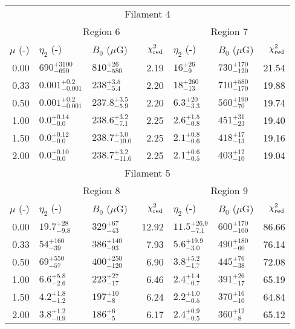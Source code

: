 \begin{tabular}{@{}rllr llr@{}}
\midrule
\multicolumn{7}{c}{Filament 4} \\
\cmidrule{1-7}
{} & \multicolumn{3}{c}{Region 6\tablenotemark{a,b}}
   & \multicolumn{3}{c}{Region 7} \\
\cmidrule(lr){2-4} \cmidrule(l){5-7}
$\mu$ (-) & $\eta_2$ (-) & $B_0$ ($\mu$G) & $\chi^2_{\mathrm{red}}$
          & $\eta_2$ (-) & $B_0$ ($\mu$G) & $\chi^2_{\mathrm{red}}$ \\
\cmidrule{1-7}

0.00 & ${690}^{+3100}_{-690}$ & ${810}^{+26}_{-580}$       & 2.19
     & ${16}^{+26}_{-9}$ & ${730}^{+170}_{-120}$           & 21.54 \\
0.33 & ${0.001}^{+0.2}_{-0.001}$ & ${238}^{+3.5}_{-5.4}$   & 2.20
     & ${18}^{+260}_{-13}$ & ${710}^{+580}_{-170}$         & 19.88 \\
0.50 & ${0.001}^{+0.2}_{-0.001}$ & ${237.8}^{+3.5}_{-5.9}$ & 2.20
     & ${6.3}^{+20}_{-3.3}$ & ${560}^{+190}_{-70}$         & 19.74 \\
1.00 & ${0.0}^{+0.14}_{-0.0}$ & ${238.6}^{+3.2}_{-7.1}$        & 2.25
     & ${2.6}^{+1.5}_{-0.8}$ & ${451}^{+31}_{-23}$         & 19.40 \\
1.50 & ${0.0}^{+0.12}_{-0.0}$ & ${238.7}^{+3.0}_{-10.0}$       & 2.25
     & ${2.1}^{+0.8}_{-0.6}$ & ${418}^{+17}_{-13}$         & 19.16 \\
2.00 & ${0.0}^{+0.10}_{-0.0}$ & ${238.7}^{+3.2}_{-11.6}$       & 2.25
     & ${2.1}^{+0.6}_{-0.5}$ & ${403}^{+12}_{-10}$         & 19.04 \\

\midrule
\multicolumn{7}{c}{Filament 5} \\
\cmidrule{1-7}
{} & \multicolumn{3}{c}{Region 8\tablenotemark{a}}
   & \multicolumn{3}{c}{Region 9} \\
\cmidrule(lr){2-4} \cmidrule(l){5-7}
$\mu$ (-) & $\eta_2$ (-) & $B_0$ ($\mu$G) & $\chi^2_{\mathrm{red}}$
          & $\eta_2$ (-) & $B_0$ ($\mu$G) & $\chi^2_{\mathrm{red}}$ \\
\cmidrule{1-7}

0.00 & ${19.7}^{+28}_{-9.8}$ & ${329}^{+67}_{-43}$     & 12.92
     & ${11.5}^{+26.9}_{-7.1}$ & ${600}^{+170}_{-100}$ & 86.66 \\
0.33 & ${54}^{+160}_{-39}$ & ${386}^{+140}_{-93}$      & 7.93
     & ${5.6}^{+19.9}_{-3.0}$ & ${490}^{+180}_{-60}$   & 76.14 \\
0.50 & ${69}^{+550}_{-57}$ & ${400}^{+250}_{-120}$     & 6.90
     & ${3.8}^{+5.2}_{-1.7}$ & ${445}^{+76}_{-38}$     & 72.08 \\
1.00 & ${6.6}^{+5.8}_{-2.6}$ & ${223}^{+27}_{-17}$     & 6.46
     & ${2.4}^{+1.4}_{-0.7}$ & ${391}^{+26}_{-17}$     & 65.19 \\
1.50 & ${4.2}^{+1.8}_{-1.2}$ & ${197}^{+10}_{-8}$      & 6.24
     & ${2.2}^{+1.0}_{-0.5}$ & ${370}^{+16}_{-10}$     & 64.84 \\
2.00 & ${3.8}^{+1.2}_{-0.9}$ & ${186}^{+6}_{-5}$       & 6.17
     & ${2.4}^{+0.9}_{-0.5}$ & ${360}^{+12}_{-8}$      & 65.12 \\

\bottomrule
\end{tabular}
